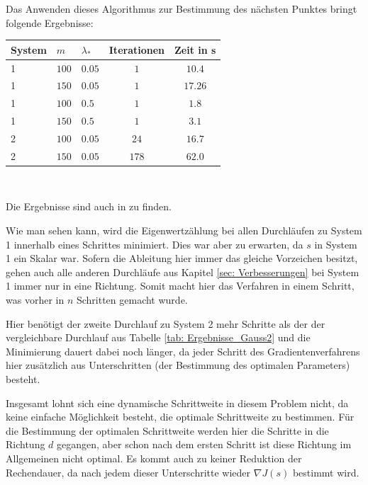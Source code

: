 \documentclass[a4paper,12pt]{report}
\newcommand{\1}{\mathds{1}}
\theoremstyle{plain} %
\theoremstyle{definition} %
\theoremstyle{remark}
\begin{document}
            Das Anwenden dieses Algorithmus zur Bestimmung des nächsten Punktes bringt folgende Ergebnisse:
            \begin{table}[!ht]
                  \centering
                  \begin{tabular}{lllcc}
                       System & $m$ & $\lambda_*$ & Iterationen & Zeit in s\\
                       \hline
                       1 & $100$ & $0.05$ & $1$ & $10.4$ \\ 
                       1 & $150$ & $0.05$ & $1$ & $17.26$ \\
                       \hline
                       1 & $100$ & $0.5$ & $1$ & $1.8$ \\
                       1 & $150$ & $0.5$ & $1$ & $3.1$ \\
                       \hline
                       2 & $100$ & $0.05$ & $24$ & $16.7$ \\
                       2 & $150$ & $0.05$ & $178$ & $62.0$ \\
                       \hline
                  \end{tabular}\\
                  \label{tab: Ergebnisse_dynamischSchritt}
            \end{table}

            Die Ergebnisse sind auch in \cite[\textit{./Verbesserung\_dynamischeSchrittweite.py}]{github} zu finden.

            Wie man sehen kann, wird die Eigenwertzählung bei allen Durchläufen zu System 1 innerhalb eines Schrittes minimiert.
            Dies war aber zu erwarten, da $s$ in System 1 ein Skalar war.
            Sofern die Ableitung hier immer das gleiche Vorzeichen besitzt, gehen auch alle anderen Durchläufe aus Kapitel \ref{sec: Verbesserungen} bei System 1 immer nur in eine Richtung.
            Somit macht hier das Verfahren in einem Schritt, was vorher in $n$ Schritten gemacht wurde.

            Hier benötigt der zweite Durchlauf zu System 2 mehr Schritte als der der vergleichbare Durchlauf aus Tabelle \ref{tab: Ergebnisse_Gauss2} und die Minimierung dauert dabei noch länger,
            da jeder Schritt des Gradientenverfahrens hier zusätzlich aus Unterschritten (der Bestimmung des optimalen Parameters) besteht.

            Insgesamt lohnt sich eine dynamische Schrittweite in diesem Problem nicht, da keine einfache Möglichkeit besteht, die optimale Schrittweite zu bestimmen.
            Für die Bestimmung der optimalen Schrittweite werden hier die Schritte in die Richtung $d$ gegangen, aber schon nach dem ersten Schritt ist diese Richtung im Allgemeinen nicht optimal.
            Es kommt auch zu keiner Reduktion der Rechendauer, da nach jedem dieser Unterschritte wieder $\nabla J(s)$ bestimmt wird.
\end{document}
